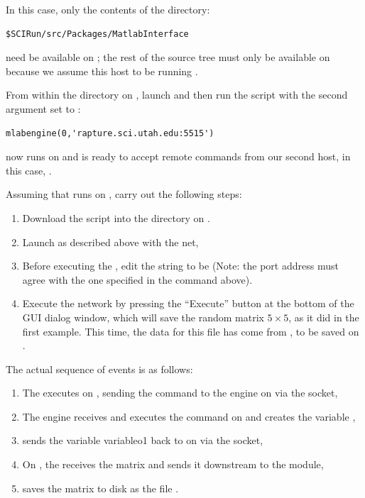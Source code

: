 In this case, only the contents of the directory: 
%
\begin{verbatim}
$SCIRun/src/Packages/MatlabInterface
\end{verbatim}
%
need be available on ; the rest of the \sr{} source tree must
only be available on  because we assume this host to be
running \sr{}.

From within the directory on , launch \m{} and then run the
 script with the second argument set to
:
%
\begin{verbatim}
mlabengine(0,'rapture.sci.utah.edu:5515')
\end{verbatim}
%
\m{} now runs on  and is ready to accept remote commands from
our second host, in this case, .

Assuming that \sr{} runs on , carry out the
following steps:
%
\begin {enumerate}
  \item Download the script  
        into the \sr{} directory on . 
  \item Launch \sr{} as described above with the  
        net,
  \item Before executing the \mlm{}, edit the  
        string to be  (Note: the port address
        must agree with the one specified in the  command
        above).
  \item Execute the network by pressing the ``Execute'' button at 
        the bottom of the \mlm{} GUI dialog window, which will save the
        random matrix $5\times 5$, as it did in the first example.  This
        time, the data for this file has come from , to be
        saved on .
\end{enumerate}

The actual sequence of events is as follows:
%
\begin{enumerate}
  \item The \mlm{} executes on , sending the \m{} 
        command
        to the engine on  via the socket,
  \item The engine receives and executes the command on 
         and creates the variable ,
  \item {} sends the variable  variable{o1} back to \sr{} on
         via the socket,
  \item On , the \mlm{} receives the matrix and 
        sends it downstream to the  module,
  \item {} saves the matrix to disk as the file
        .
\end{enumerate}


